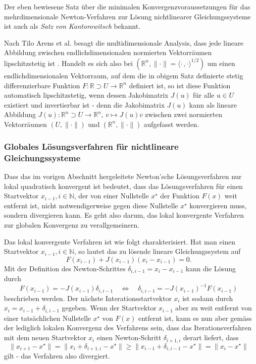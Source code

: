 \documentclass[a4paper,12pt]{article}
\numberwithin{equation}{section}
\begin{document}
Der eben bewiesene Satz über die minimalen Konvergenzvoraussetzungen für das mehrdimensionale Newton-Verfahren zur Lösung nichtlinearer Gleichungssysteme ist auch als \textit{Satz von Kantorowitsch} bekannt.

Nach Tilo Arens et al. besagt die multidimensionale Analysis, dass jede lineare Abbildung zwischen endlichdimensionalen normierten Vektorräumen lipschitzstetig ist \cite[S.780]{Arens.2013}. Handelt es sich also bei $(\mathbb{R}^n,\|\cdot\| = \langle \cdot\,,\cdot\rangle^{1/2})$ um einen endlichdimensionalen Vektorraum, auf dem die in obigem Satz definierte stetig differenzierbare Funktion $F:\mathbb{R} \supset U \rightarrow \mathbb{R}^n$ definiert ist, so ist diese Funktion automatisch lipschitzstetig, wenn dessen Jakobimatrix $J(u)$ für alle $u\in U$ existiert und invertierbar ist - denn die Jakobimatrix $J(u)$ kann als lineare Abbildung $J(u): \mathbb{R}^n\supset U \rightarrow \mathbb{R}^n, \, v \mapsto J(u)v$ zwischen zwei normierten Vektorräumen $(U,\|\cdot\|)$ und $(\mathbb{R}^n,\|\cdot\|)$ aufgefasst werden.

\subsubsection{Globales Lösungsverfahren für nichtlineare Gleichungssysteme}\label{sec:globloesnonlinear}
Dass das im vorigen Abschnitt hergeleitete Newton'sche Lösungsverfahren nur lokal quadratisch konvergent ist bedeutet, dass das Lösungsverfahren für einen Startvektor $x_{i-1}, i \in \mathbb{N}$, der von einer Nullstelle $x^\star$ der Funktion $F(x)$ weit entfernt ist, nicht notwendigerweise gegen diese Nullstelle $x^\star$ konvergieren muss, sondern divergieren kann. Es geht also darum, das lokal konvergente Verfahren zur globalen Konvergenz zu verallgemeinern. 

Das lokal konvergente Verfahren ist wie folgt charakterisiert. Hat man einen Startvektor $x_{i-1}, i \in \mathbb{N}$, so lautet das zu lösende lineare Gleichungssystem auf \begin{equation}
F(x_{i-1}) + J(x_{i-1})(x_i-x_{i-1}) = 0.
\end{equation} Mit der Definition des Newton-Schrittes $\delta_{i,i-1} = x_i-x_{i-1}$ kann die Lösung durch \begin{equation}F(x_{i-1}) = -J(x_{i-1})\delta_{i,i-1} \quad \Leftrightarrow \quad \delta_{i,i-1} = -J(x_{i-1})^{-1}F(x_{i-1}) \end{equation} beschrieben werden. Der nächste Interationsstartvektor $x_i$ ist sodann durch $x_i = x_{i-1} + \delta_{i,i-1}$ gegeben. Wenn der Startvektor $x_{i-1}$ aber zu weit entfernt von einer tatsächlichen Nullstelle $x^\star$ von $F(x)$ entfernt ist, kann es nun aber gemäss der lediglich lokalen Konvergenz des Verfahrens sein, dass das Iterationsverfahren mit dem neuen Startvektor $x_i$ einen Newton-Schritt $\delta_{i+1,i}$ derart liefert, dass \begin{equation}\|x_{i+1} - x^\star\| = \|x_i + \delta_{i+1,i}-x^\star\|\geq \|x_{i-1} + \delta_{i,i-1}-x^\star\| = \|x_{i}-x^\star\| \end{equation} gilt - das Verfahren also divergiert. 
\end{document}
